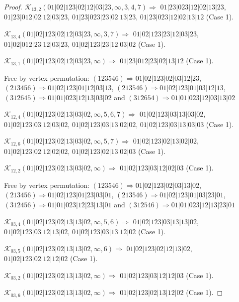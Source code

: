 \documentclass[12pt]{article}
\theoremstyle{plain}
\theoremstyle{definition}
\theoremstyle{remark}
\newcommand{\fancy}[1]{\mathcal{#1}}
\def\K{\fancy{K}}
\begin{document}
\begin{proof}
	
	
	\bigskip
	
	$\K_{13,2}(01|02|123|02|12|03|23,\infty,3, 4, 7)\Rightarrow $ $01|23|023|12|02|13|23$, $01|23|012|02|12|03|23$, $01|23|023|23|02|13|23$, $01|23|023|12|02|13|12$ (Case 1).
	
	$\K_{13,4}(01|02|123|02|12|03|23,\infty,3, 7)\Rightarrow $ $01|02|123|23|12|03|23$, $01|02|012|23|12|03|23$, $01|02|123|23|12|03|02$ (Case 1).
	
	$\K_{13,1}(01|02|123|02|12|03|23,\infty)\Rightarrow $ $01|23|012|23|02|13|12$ (Case 1).
	
	
	
	Free by vertex permutation: $(1 2 3 5 4 6)\Rightarrow 01|02|123|02|03|12|23$, $(2 1 3 4 5 6)\Rightarrow 01|02|123|01|12|03|13$, $(2 1 3 5 4 6)\Rightarrow 01|02|123|01|03|12|13$, $(3 1 2 6 4 5)\Rightarrow 01|01|023|12|13|03|02$ and $(3 1 2 6 5 4)\Rightarrow 01|01|023|12|03|13|02$
	
	
	
	\bigskip
	
	$\K_{12,4}(01|02|123|02|13|03|02,\infty,5, 6, 7)\Rightarrow $ $01|02|123|03|13|03|02$, $01|02|123|03|12|03|02$, $01|02|123|03|13|02|02$, $01|02|123|03|13|03|03$ (Case 1).
	
	$\K_{12,6}(01|02|123|02|13|03|02,\infty,5, 7)\Rightarrow $ $01|02|123|02|13|02|02$, $01|02|123|02|12|02|02$, $01|02|123|02|13|02|03$ (Case 1).
	
	$\K_{12,2}(01|02|123|02|13|03|02,\infty)\Rightarrow $ $01|02|123|03|12|02|03$ (Case 1).
	
	
	
	Free by vertex permutation: $(1 2 3 5 4 6)\Rightarrow 01|02|123|02|03|13|02$, $(2 1 3 4 5 6)\Rightarrow 01|02|123|01|23|03|01$, $(2 1 3 5 4 6)\Rightarrow 01|02|123|01|03|23|01$, $(3 1 2 4 5 6)\Rightarrow 01|01|023|12|23|13|01$ and $(3 1 2 5 4 6)\Rightarrow 01|01|023|12|13|23|01$
	
	
	
	\bigskip
	
	$\K_{03,4}(01|02|123|02|13|13|02,\infty,5, 6)\Rightarrow $ $01|02|123|03|13|13|02$, $01|02|123|03|12|13|02$, $01|02|123|03|13|12|02$ (Case 1).
	
	$\K_{03,5}(01|02|123|02|13|13|02,\infty,6)\Rightarrow $ $01|02|123|02|12|13|02$, $01|02|123|02|12|12|02$ (Case 1).
	
	$\K_{03,2}(01|02|123|02|13|13|02,\infty)\Rightarrow $ $01|02|123|03|12|12|03$ (Case 1).
	
	$\K_{03,6}(01|02|123|02|13|13|02,\infty)\Rightarrow $ $01|02|123|02|13|12|02$ (Case 1).
	

\end{proof}
\end{document}
